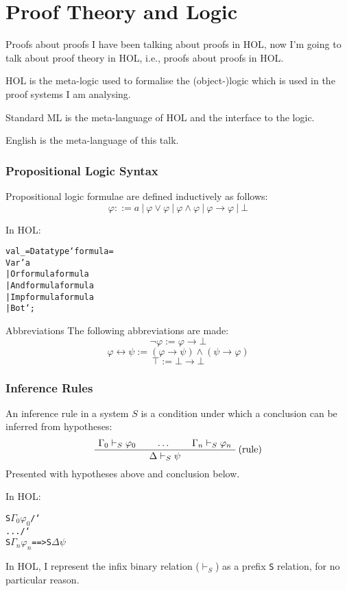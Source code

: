\documentclass[english,svgnames,hide notes,12pt]{beamer}
\theoremstyle{definition}
\theoremstyle{remark}
\begin{document}
\section{Proof Theory and Logic}

\begin{frame}{Proofs about proofs}
    I have been talking about proofs in HOL, now I'm going to talk about proof theory in HOL, i.e., proofs about proofs in HOL.

    \bigskip
    HOL is the meta-logic used to formalise the (object-)logic which is used in the proof systems I am analysing.

    \bigskip
    Standard ML is the meta-language of HOL and the interface to the logic.

    \bigskip
    English is the meta-language of this talk.
\end{frame}

\begin{frame}[fragile]
    \frametitle{Propositional Logic Syntax}
    Propositional logic formulae are defined inductively as follows:
    \[ \varphi ::= a~|~\varphi \lor \varphi~|~\varphi \land \varphi~|~\varphi \to \varphi~|~\bot \]

    \bigskip
    In HOL:
    \small
\begin{alltt}
val _ = Datatype `formula =
    Var 'a
    | Or formula formula
    | And formula formula
    | Imp formula formula
    | Bot`;
\end{alltt}
\end{frame}

\begin{frame}{Abbreviations}
  The following abbreviations are made:
  \[ \neg \varphi := \varphi \to \bot \]
  \[ \varphi \leftrightarrow \psi := (\varphi \to \psi) \land (\psi \to \varphi) \]
  \[ \top := \bot \to \bot \]
\end{frame}

\newcommand{\bs}{\char`\\}
\begin{frame}[fragile]
    \frametitle{Inference Rules}
    An inference rule in a system $S$ is a condition under which a conclusion can be inferred from hypotheses:
    \[
        \AxiomC{$\Gamma_0 \vdash_S \varphi_0$}
        \AxiomC{$\dots$}
        \AxiomC{$\Gamma_n \vdash_S \varphi_n$}
        \RightLabel{(rule)}
        \TrinaryInfC{$\Delta \vdash_S \psi$}
        \DisplayProof
    \]
    Presented with hypotheses above and conclusion below.

    \bigskip
    In HOL:
    \begin{alltt}
        S \(\Gamma_0\) \(\varphi_0\) /\bs{} ... /\bs{} S \(\Gamma_n\) \(\varphi_n\) ==> S \(\Delta\) \(\psi\)
    \end{alltt}

    In HOL, I represent the infix binary relation ($\vdash_S$) as a prefix \texttt{S} relation, for no particular reason.
\end{frame}
\end{document}
